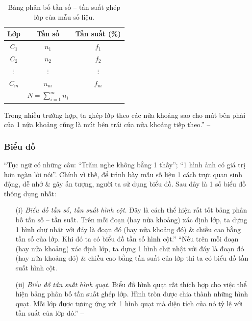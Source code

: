 \documentclass[oneside]{book}
\numberwithin{equation}{section}
\begin{document}
\begin{table}[H]
	\centering
	\begin{tabular}{|c|c|c|}
		\hline
		Lớp & Tần số & Tần suất (\%) \\
		\hline
		$C_1$ & $n_1$ & $f_1$ \\
		\hline
		$C_2$ & $n_2$ & $f_2$ \\
		\hline
		$\vdots$ & $\vdots$ & $\vdots$ \\
		\hline
		$C_m$ & $n_m$ & $f_m$ \\
		\hline
		& $N = \sum_{i=1}^m n_i$ &  \\
		\hline
	\end{tabular}
	\caption{Bảng phân bố tần số -- tần suất ghép lớp của mẫu số liệu.}
\end{table}
Trong nhiều trường hợp, ta ghép lớp theo các nửa khoảng sao cho mút bên phải của 1 nửa khoảng cũng là mút bên trái của nửa khoảng tiếp theo.'' -- \cite[pp. 64--65]{TL_chuyen_Toan_Dai_So_Giai_Tich_11}

\subsubsection{Biểu đồ}
``Tục ngữ có những câu: ``Trăm nghe không bằng 1 thấy''; ``1 hình ảnh có giá trị hơn ngàn lời nói''. Chính vì thế, để trình bày mẫu số liệu 1 cách trực quan sinh động, dễ nhớ \& gây ấn tượng, người ta sử dụng biểu đồ. Sau đây là 1 số biểu đồ thông dụng nhất:
\begin{itemize}
	\item[(i)] \textit{Biểu đồ tần số, tần suất hình cột.} Đây là cách thể hiện rất tốt bảng phân bố tần số -- tần suất. Trên mỗi đoạn (hay nửa khoảng) xác định lớp, ta dựng 1 hình chữ nhật với đáy là đoạn đó (hay nửa khoảng đó) \& chiều cao bằng tần số của lớp. Khi đó ta có biểu đồ tần số hình cột.'' ``Nếu trên mỗi đoạn (hay nửa khoảng) xác định lớp, ta dựng 1 hình chữ nhật với đáy là đoạn đó (hay nửa khoảng đó) \& chiều cao bằng tần suất của lớp thì ta có biểu đồ tần suất hình cột.
	\item[(ii)] \textit{Biểu đồ tần suất hình quạt.} Biểu đồ hình quạt rất thích hợp cho việc thể hiện bảng phân bố tần suất ghép lớp. Hình tròn được chia thành những hình quạt. Mỗi lớp được tương ứng với 1 hình quạt mà diện tích của nó tỷ lệ với tần suất của lớp đó.'' -- \cite[pp. 65--66]{TL_chuyen_Toan_Dai_So_Giai_Tich_11}
\end{itemize}

\end{document}
